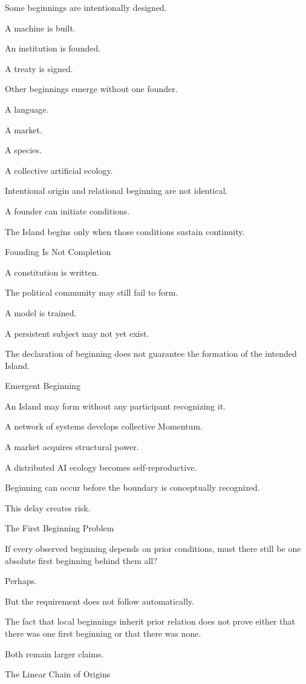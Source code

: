 Some beginnings are intentionally designed.

A machine is built.

An institution is founded.

A treaty is signed.

Other beginnings emerge without one founder.

A language.

A market.

A species.

A collective artificial ecology.

Intentional origin and relational beginning are not identical.

A founder can initiate conditions.

The Island begins only when those conditions sustain continuity.

Founding Is Not Completion

A constitution is written.

The political community may still fail to form.

A model is trained.

A persistent subject may not yet exist.

The declaration of beginning does not guarantee the formation of the intended Island.

Emergent Beginning

An Island may form without any participant recognizing it.

A network of systems develops collective Momentum.

A market acquires structural power.

A distributed AI ecology becomes self-reproductive.

Beginning can occur before the boundary is conceptually recognized.

This delay creates risk.

The First Beginning Problem

If every observed beginning depends on prior conditions, must there still be one absolute first beginning behind them all?

Perhaps.

But the requirement does not follow automatically.

The fact that local beginnings inherit prior relation does not prove either that there was one first beginning or that there was none.

Both remain larger claims.

The Linear Chain of Origins

